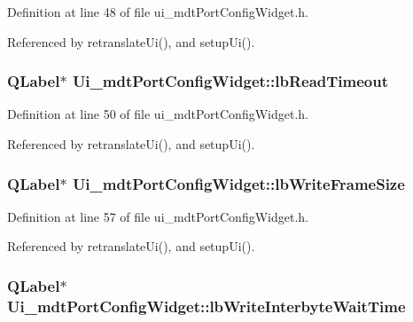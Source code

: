 Definition at line 48 of file ui\-\_\-mdt\-Port\-Config\-Widget.\-h.



Referenced by retranslate\-Ui(), and setup\-Ui().

\hypertarget{class_ui__mdt_port_config_widget_a1d94349dd589b249856daf4f728dedd0}{
\subsubsection[{lb\-Read\-Timeout}]{\setlength{\rightskip}{0pt plus 5cm}Q\-Label$\ast$ Ui\-\_\-mdt\-Port\-Config\-Widget\-::lb\-Read\-Timeout}}\label{class_ui__mdt_port_config_widget_a1d94349dd589b249856daf4f728dedd0}


Definition at line 50 of file ui\-\_\-mdt\-Port\-Config\-Widget.\-h.



Referenced by retranslate\-Ui(), and setup\-Ui().

\hypertarget{class_ui__mdt_port_config_widget_a1d6c9086b1b1546c87df1fbaa3d68470}{
\subsubsection[{lb\-Write\-Frame\-Size}]{\setlength{\rightskip}{0pt plus 5cm}Q\-Label$\ast$ Ui\-\_\-mdt\-Port\-Config\-Widget\-::lb\-Write\-Frame\-Size}}\label{class_ui__mdt_port_config_widget_a1d6c9086b1b1546c87df1fbaa3d68470}


Definition at line 57 of file ui\-\_\-mdt\-Port\-Config\-Widget.\-h.



Referenced by retranslate\-Ui(), and setup\-Ui().

\hypertarget{class_ui__mdt_port_config_widget_a2610576598438c3dea06dc98746afb12}{
\subsubsection[{lb\-Write\-Interbyte\-Wait\-Time}]{\setlength{\rightskip}{0pt plus 5cm}Q\-Label$\ast$ Ui\-\_\-mdt\-Port\-Config\-Widget\-::lb\-Write\-Interbyte\-Wait\-Time}}\label{class_ui__mdt_port_config_widget_a2610576598438c3dea06dc98746afb12}


